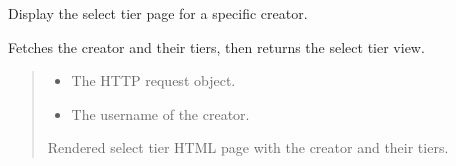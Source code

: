 \documentclass[letterpaper,10pt,english]{sphinxmanual}
\begin{document}
\begin{fulllineitems}
\label{\detokenize{modules/views:client.views.select_tier}}
\pysigstartsignatures
{}
\pysigstopsignatures
\sphinxAtStartPar
Display the select tier page for a specific creator.

\sphinxAtStartPar
Fetches the creator and their tiers, then returns the select tier view.
\begin{quote}\begin{description}
\begin{itemize}
\item {} 
\sphinxAtStartPar
{} \textendash{} The HTTP request object.

\item {} 
\sphinxAtStartPar
{} \textendash{} The username of the creator.

\end{itemize}

\sphinxAtStartPar
Rendered select tier HTML page with the creator and their tiers.

\end{description}\end{quote}

\end{fulllineitems}

\end{document}
